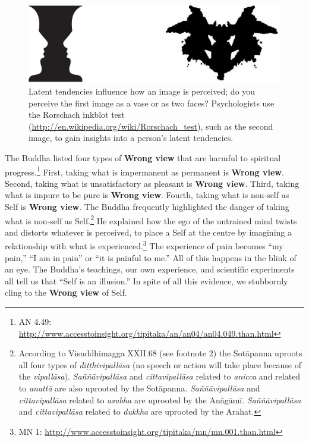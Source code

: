 \begin{figure}[h]
\centering
\includegraphics[width=0.95\linewidth]{./Diagrams/Perception}
\caption{Latent tendencies influence how an image is perceived; do you perceive the first image as a vase or as two faces? Psychologists use the Rorschach inkblot test (\url{http://en.wikipedia.org/wiki/Rorschach_test}), such as the second image, to gain insights into a person’s latent tendencies.}
\label{fig:Perception}
\end{figure}

The Buddha listed four types of \textbf{Wrong view} that are harmful to spiritual progress.\footnote{AN 4.49: \url{http://www.accesstoinsight.org/tipitaka/an/an04/an04.049.than.html}} First, taking what is impermanent as permanent is \textbf{Wrong view}. Second, taking what is unsatisfactory as pleasant is \textbf{Wrong view}. Third, taking what is impure to be pure is \textbf{Wrong view}. Fourth, taking what is non-self as Self is \textbf{Wrong view}. The Buddha frequently highlighted the danger of taking what is non-self as Self.\footnote{According to Visuddhimagga XXII.68 (see footnote 2) the Sotāpanna uproots all four types of \textit{diṭṭhivipallāsa} (no speech or action will take place because of the \textit{vipallāsa}). \textit{Saññāvipallāsa} and \textit{cittavipallāsa} related to \textit{anicca} and related to \textit{anattā} are also uprooted by the Sotāpanna. \textit{Saññāvipallāsa} and \textit{cittavipallāsa} related to \textit{asubha} are uprooted by the Anāgāmī. \textit{Saññāvipallāsa} and \textit{cittavipallāsa} related to \textit{dukkha} are uprooted by the Arahat.} He explained how the ego of the untrained mind twists and distorts whatever is perceived, to place a Self at the centre by imagining a relationship with what is experienced.\footnote{MN 1: \url{http://www.accesstoinsight.org/tipitaka/mn/mn.001.than.html}} The experience of pain becomes “my pain,” “I am in pain” or “it is painful to me.” All of this happens in the blink of an eye. The Buddha’s teachings, our own experience, and scientific experiments all tell us that “Self is an illusion.” In spite of all this evidence, we stubbornly cling to the \textbf{Wrong view} of Self.

